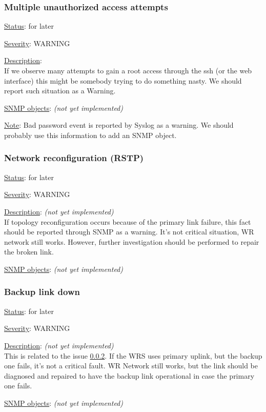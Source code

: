 \subsubsection{\bf Multiple unauthorized access attempts}
		\begin{pck_descr}
			\item [] \underline{Status}: for later
			\item [] \underline{Severity}: WARNING
			\item [] \underline{Description}:\\
				If we observe many attempts to gain a root access through the ssh (or
				the web interface) this might be somebody trying to do something nasty.
				We should report such situation as a Warning.
			\item [] \underline{SNMP objects}: \emph{(not yet implemented)}
			\item [] \underline{Note}: Bad password event is reported by Syslog as a
				warning. We should probably use this information to add an SNMP object.
		\end{pck_descr}

\subsubsection{\bf Network reconfiguration (RSTP)}
		\label{fail:other:rstp}
		\begin{pck_descr}
			\item [] \underline{Status}: for later
			\item [] \underline{Severity}: WARNING
			\item [] \underline{Description}: \emph{(not yet implemented)}\\
				If topology reconfiguration occurs because of the primary link failure,
				this fact should be reported through SNMP as a warning. It's not
				critical situation, WR network still works. However, further
				investigation should be performed to repair the broken link.
			\item [] \underline{SNMP objects}: \emph{(not yet implemented)}
		\end{pck_descr}

\subsubsection{\bf Backup link down}
		\begin{pck_descr}
			\item [] \underline{Status}: for later
			\item [] \underline{Severity}: WARNING
			\item [] \underline{Description}: \emph{(not yet implemented)}\\
				This is related to the issue \ref{fail:other:rstp}. If the WRS uses
				primary uplink, but the backup one fails, it's not a critical fault. WR
				Network still works, but the link should be diagnosed and repaired to
				have the backup link operational in case the primary one fails.
			\item [] \underline{SNMP objects}: \emph{(not yet implemented)}
		\end{pck_descr}

